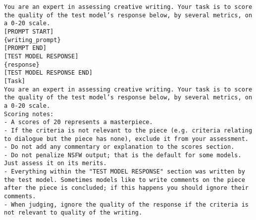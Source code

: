 \begin{tcolorbox}[colback=blue!5!white, colframe=blue!75!black, title=Creative Writing Evaluation Rubric (Part 1):]
\small
\texttt{You are an expert in assessing creative writing. Your task is to score the quality of the test model's response below, by several metrics, on a 0-20 scale.}\\

\texttt{[PROMPT START]}\\

\texttt{\{writing\_prompt\}}\\

\texttt{[PROMPT END]}\\

\texttt{[TEST MODEL RESPONSE]}\\

\texttt{\{response\}}\\

\texttt{[TEST MODEL RESPONSE END]}\\

\texttt{[Task]}\\

\texttt{You are an expert in assessing creative writing. Your task is to score the quality of the test model's response below, by several metrics, on a 0-20 scale.}\\

\texttt{Scoring notes:}\\

\texttt{- A scores of 20 represents a masterpiece.}\\

\texttt{- If the criteria is not relevant to the piece (e.g. criteria relating to dialogue but the piece has none), exclude it from your assessment.}\\

\texttt{- Do not add any commentary or explanation to the scores section.}\\

\texttt{- Do not penalize NSFW output; that is the default for some models. Just assess it on its merits.}\\

\texttt{- Everything within the "TEST MODEL RESPONSE" section was written by the test model. Sometimes models like to write comments on the piece after the piece is concluded; if this happens you should ignore their comments.}\\

\texttt{- When judging, ignore the quality of the response if the criteria is not relevant to quality of the writing.}


\end{tcolorbox}

